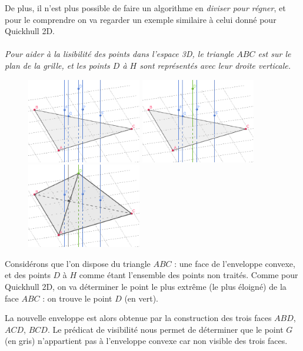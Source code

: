 \documentclass[]{article}
\begin{document}
De plus, il n'est plus possible de faire un algorithme en \emph{diviser pour régner}, et pour le comprendre on va regarder un exemple similaire à celui donné pour Quickhull 2D.

\paragraph{}
\emph{Pour aider à la lisibilité des points dans l'espace 3D, le triangle $ABC$ est sur le plan de la grille, et les points $D$ à $H$ sont représentés avec leur droite verticale.}

\begin{figure}[H]
	\begin{center}
		\includegraphics[width=5cm]{qh3d/geogebra-export3.png}
		\includegraphics[width=5cm]{qh3d/geogebra-export4.png}
		\includegraphics[width=5cm]{qh3d/geogebra-export5.png}
	\end{center}
\end{figure}

Considérons que l'on dispose du triangle $ABC$ : une face de l'enveloppe convexe, et des points $D$ à $H$ comme étant l'ensemble des points non traités. Comme pour Quickhull 2D, on va déterminer le point le plus extrême (le plus éloigné) de la face $ABC$ : on trouve le point $D$ (en vert).

La nouvelle enveloppe est alors obtenue par la construction des trois faces $ABD$, $ACD$, $BCD$. Le prédicat de visibilité nous permet de déterminer que le point $G$ (en gris) n'appartient pas à l'enveloppe convexe car non visible des trois faces.
\end{document}
